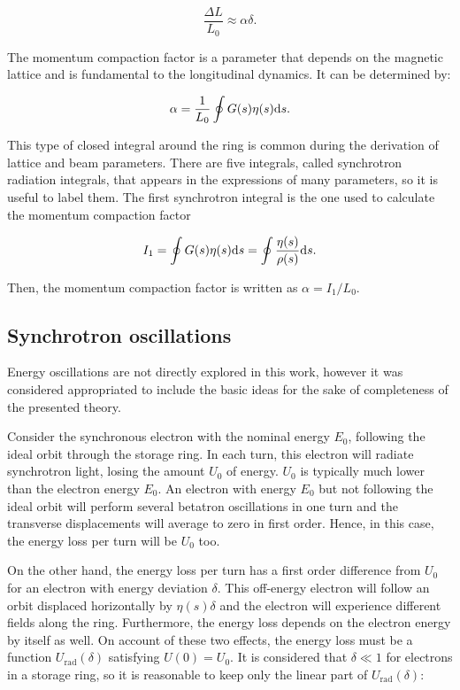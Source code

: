 \begin{equation}
    \frac{\Delta L}{L_0} \approx \alpha \delta.
    \label{orbitlen}
\end{equation}

The momentum compaction factor is a parameter that depends on the magnetic lattice and is fundamental to the longitudinal dynamics. It can be determined by:

\begin{equation}
    \alpha = \dfrac{1}{L_0}\oint G(s) \eta(s) \mathrm{d} s.
\end{equation}

This type of closed integral around the ring is common during the derivation of lattice and beam parameters. There are five integrals, called synchrotron radiation integrals, that appears in the expressions of many parameters, so it is useful to label them. The first synchrotron integral is the one used to calculate the momentum compaction factor

\begin{equation}
    I_1 = \oint G(s) \eta(s) \mathrm{d} s = \oint \dfrac{\eta(s)}{\rho(s)} \mathrm{d} s.
\end{equation}

Then, the momentum compaction factor is written as $\alpha = I_1/L_0$.

\subsection{Synchrotron oscillations}

Energy oscillations are not directly explored in this work, however it was considered appropriated to include the basic ideas for the sake of completeness of the presented theory.

Consider the synchronous electron with the nominal energy $E_0$, following the ideal orbit through the storage ring. In each turn, this electron will radiate synchrotron light, losing the amount $U_0$ of energy. $U_0$ is typically much lower than the electron energy $E_0$. An electron with energy $E_0$ but not following the ideal orbit will perform several betatron oscillations in one turn and the transverse displacements will average to zero in first order. Hence, in this case, the energy loss per turn will be $U_0$ too. 

On the other hand, the energy loss per turn has a first order difference from $U_0$ for an electron with energy deviation $\delta$. This off-energy electron will follow an orbit displaced horizontally by $\eta(s)\delta$ and the electron will experience different fields along the ring. Furthermore, the energy loss depends on the electron energy by itself as well. On account of these two effects, the energy loss must be a function $U_{\mathrm{rad}}(\delta)$ satisfying $U(0) = U_0$. It is considered that $\delta \ll 1$ for electrons in a storage ring, so it is reasonable to keep only the linear part of $U_{\mathrm{rad}}(\delta)$:

